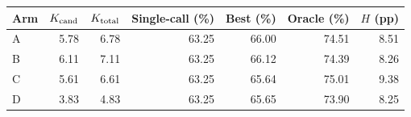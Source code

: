 \begin{tabular}{@{}lrrrrrr@{}}
\toprule
Arm & $K_{\rm cand}$ & $K_{\rm total}$ & Single-call (\%) & Best (\%) & Oracle (\%) & $H$ (pp) \\
\midrule
A & 5.78 & 6.78 & 63.25 & 66.00 & 74.51 & 8.51 \\
B & 6.11 & 7.11 & 63.25 & 66.12 & 74.39 & 8.26 \\
C & 5.61 & 6.61 & 63.25 & 65.64 & 75.01 & 9.38 \\
D & 3.83 & 4.83 & 63.25 & 65.65 & 73.90 & 8.25 \\
\bottomrule
\end{tabular}
